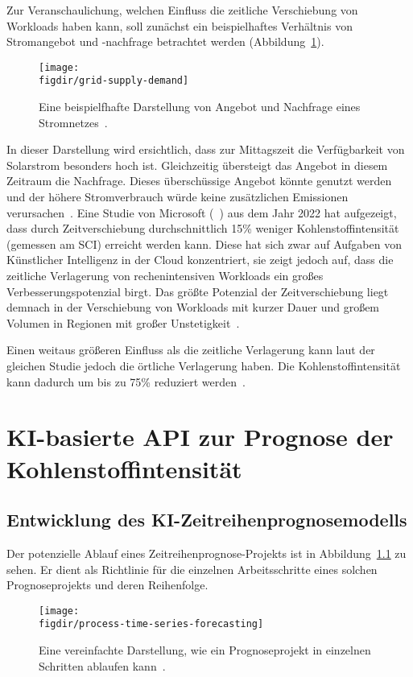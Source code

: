 Zur Veranschaulichung, welchen Einfluss die zeitliche Verschiebung von Workloads haben kann, soll zunächst ein beispielhaftes Verhältnis von Stromangebot und -nachfrage betrachtet werden (Abbildung~\ref{FIG:grid-supply-demand}).
\begin{figure}
 \caption{Eine beispielfhafte Darstellung von Angebot und Nachfrage eines Stromnetzes~\cite{Peixeiro.2022}.}
 {\texttt{[image: \\figdir/grid-supply-demand]}}
 \label{FIG:grid-supply-demand}
\end{figure}
In dieser Darstellung wird ersichtlich, dass zur Mittagszeit die Verfügbarkeit von Solarstrom besonders hoch ist.
Gleichzeitig übersteigt das Angebot in diesem Zeitraum die Nachfrage.
Dieses überschüssige Angebot könnte genutzt werden und der höhere Stromverbrauch würde keine zusätzlichen Emissionen verursachen~\cite{Buchanan.2023}.
Eine Studie von Microsoft (~\cite{Dodge.06212022}) aus dem Jahr 2022 hat aufgezeigt, dass durch Zeitverschiebung durchschnittlich 15\% weniger Kohlenstoffintensität (gemessen am SCI) erreicht werden kann.
Diese hat sich zwar auf Aufgaben von Künstlicher Intelligenz in der Cloud konzentriert, sie zeigt jedoch auf, dass die zeitliche Verlagerung von rechenintensiven Workloads ein großes Verbesserungspotenzial birgt.
Das größte Potenzial der Zeitverschiebung liegt demnach in der Verschiebung von Workloads mit kurzer Dauer und großem Volumen in Regionen mit großer Unstetigkeit~\cite{Buchanan.2023}.

Einen weitaus größeren Einfluss als die zeitliche Verlagerung kann laut der gleichen Studie jedoch die örtliche Verlagerung haben.
Die Kohlenstoffintensität kann dadurch um bis zu 75\% reduziert werden~\cite{Dodge.06212022}.

\chapter{KI-basierte API zur Prognose der Kohlenstoffintensität}
\section{Entwicklung des KI-Zeitreihenprognosemodells}
Der potenzielle Ablauf eines Zeitreihenprognose-Projekts ist in Abbildung~\ref{FIG:process-time-series-forecasting} zu sehen.
Er dient als Richtlinie für die einzelnen Arbeitsschritte eines solchen Prognoseprojekts und deren Reihenfolge.

\begin{figure}
 \caption{Eine vereinfachte Darstellung, wie ein Prognoseprojekt in einzelnen Schritten ablaufen kann~\cite{Peixeiro.2022}.}
 {\texttt{[image: \\figdir/process-time-series-forecasting]}}
 \label{FIG:process-time-series-forecasting}
\end{figure}

